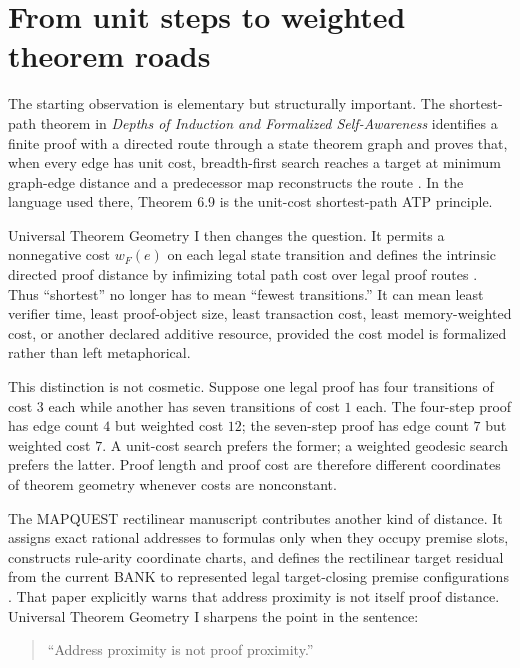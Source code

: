\documentclass[11pt]{article}
\theoremstyle{definition}
\theoremstyle{remark}
\begin{document}
\tableofcontents
\newpage

\section{From unit steps to weighted theorem roads}

The starting observation is elementary but structurally important. The shortest-path theorem in \emph{Depths of Induction and Formalized Self-Awareness} identifies a finite proof with a directed route through a state theorem graph and proves that, when every edge has unit cost, breadth-first search reaches a target at minimum graph-edge distance and a predecessor map reconstructs the route \cite{Depths46}. In the language used there, Theorem 6.9 is the unit-cost shortest-path ATP principle.

Universal Theorem Geometry I then changes the question. It permits a nonnegative cost $w_F(e)$ on each legal state transition and defines the intrinsic directed proof distance by infimizing total path cost over legal proof routes \cite{UTGI}. Thus ``shortest'' no longer has to mean ``fewest transitions.'' It can mean least verifier time, least proof-object size, least transaction cost, least memory-weighted cost, or another declared additive resource, provided the cost model is formalized rather than left metaphorical.

This distinction is not cosmetic. Suppose one legal proof has four transitions of cost $3$ each while another has seven transitions of cost $1$ each. The four-step proof has edge count $4$ but weighted cost $12$; the seven-step proof has edge count $7$ but weighted cost $7$. A unit-cost search prefers the former; a weighted geodesic search prefers the latter. Proof length and proof cost are therefore different coordinates of theorem geometry whenever costs are nonconstant.

The MAPQUEST rectilinear manuscript contributes another kind of distance. It assigns exact rational addresses to formulas only when they occupy premise slots, constructs rule-arity coordinate charts, and defines the rectilinear target residual from the current BANK to represented legal target-closing premise configurations \cite{MRTD}. That paper explicitly warns that address proximity is not itself proof distance. Universal Theorem Geometry I sharpens the point in the sentence:

\begin{quote}
``Address proximity is not proof proximity.'' \cite{UTGI}
\end{quote}
\end{document}
